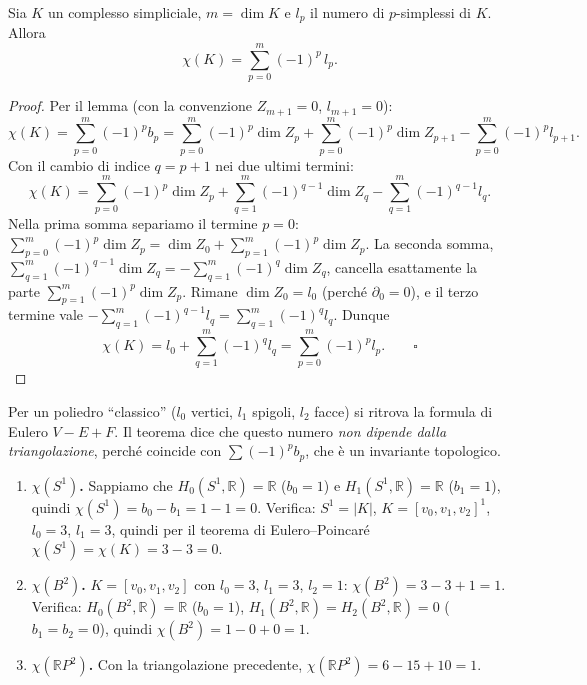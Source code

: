 \begin{teo}
Sia $K$ un complesso simpliciale, $m = \dim K$ e $l_p$ il numero di $p$-simplessi di $K$. Allora
\[
\chi(K) = \sum_{p=0}^m (-1)^p\, l_p .
\]
\end{teo}
\begin{proof}
Per il lemma (con la convenzione $Z_{m+1} = 0$, $l_{m+1} = 0$):
\[
\chi(K) = \sum_{p=0}^m (-1)^p b_p = \sum_{p=0}^m (-1)^p \dim Z_p + \sum_{p=0}^m (-1)^p \dim Z_{p+1} - \sum_{p=0}^m (-1)^p l_{p+1} .
\]
Con il cambio di indice $q = p+1$ nei due ultimi termini:
\[
\chi(K) = \sum_{p=0}^m (-1)^p \dim Z_p + \sum_{q=1}^m (-1)^{q-1} \dim Z_q - \sum_{q=1}^m (-1)^{q-1} l_q .
\]
Nella prima somma separiamo il termine $p = 0$: $\sum_{p=0}^m (-1)^p \dim Z_p = \dim Z_0 + \sum_{p=1}^m (-1)^p \dim Z_p$. La seconda somma, $\sum_{q=1}^m (-1)^{q-1} \dim Z_q = -\sum_{q=1}^m (-1)^q \dim Z_q$, cancella esattamente la parte $\sum_{p=1}^m (-1)^p \dim Z_p$. Rimane $\dim Z_0 = l_0$ (perch\'e $\partial_0 = 0$), e il terzo termine vale $-\sum_{q=1}^m (-1)^{q-1} l_q = \sum_{q=1}^m (-1)^q l_q$. Dunque
\[
\chi(K) = l_0 + \sum_{q=1}^m (-1)^q l_q = \sum_{p=0}^m (-1)^p l_p . \qquad \square
\]
\end{proof}

\begin{intuizione}
Per un poliedro ``classico'' ($l_0$ vertici, $l_1$ spigoli, $l_2$ facce) si ritrova la formula di Eulero $V - E + F$. Il teorema dice che questo numero \emph{non dipende dalla triangolazione}, perch\'e coincide con $\sum (-1)^p b_p$, che \`e un invariante topologico.
\end{intuizione}

\begin{ejemplo}
\begin{enumerate}
    \item \textbf{$\chi(S^1)$.} Sappiamo che $H_0(S^1, \mathbb{R}) = \mathbb{R}$ ($b_0 = 1$) e $H_1(S^1, \mathbb{R}) = \mathbb{R}$ ($b_1 = 1$), quindi $\chi(S^1) = b_0 - b_1 = 1 - 1 = 0$. Verifica: $S^1 = |K|$, $K = [v_0, v_1, v_2]^1$, $l_0 = 3$, $l_1 = 3$, quindi per il teorema di Eulero--Poincar\'e $\chi(S^1) = \chi(K) = 3 - 3 = 0$.
    \item \textbf{$\chi(B^2)$.} $K = [v_0, v_1, v_2]$ con $l_0 = 3$, $l_1 = 3$, $l_2 = 1$: $\chi(B^2) = 3 - 3 + 1 = 1$. Verifica: $H_0(B^2, \mathbb{R}) = \mathbb{R}$ ($b_0 = 1$), $H_1(B^2, \mathbb{R}) = H_2(B^2, \mathbb{R}) = 0$ ($b_1 = b_2 = 0$), quindi $\chi(B^2) = 1 - 0 + 0 = 1$.
    \item \textbf{$\chi(\mathbb{R}P^2)$.} Con la triangolazione precedente, $\chi(\mathbb{R}P^2) = 6 - 15 + 10 = 1$.
\end{enumerate}
\end{ejemplo}

